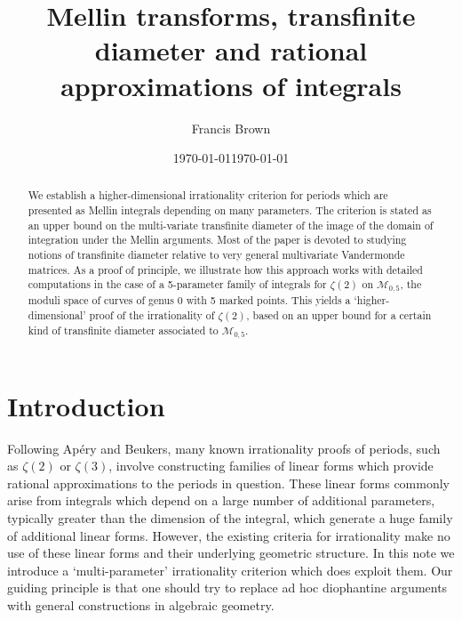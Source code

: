 \documentclass[a4paper,10pt]{amsart}
\date{\today}
\theoremstyle{definition}
\theoremstyle{remark}
\numberwithin{equation}{section}
\newcommand{\0}{\color{blue}{\mathsf{0}}}
\begin{document}
\title{Mellin transforms, transfinite diameter and rational approximations of integrals}
\author{Francis Brown}
\address{University of Oxford, Radcliffe Observatory, Andrew Wiles Building, Woodstock Rd, Oxford, United Kingdom, OX2 6GG}
\date{\today}

\maketitle

\begin{abstract}
We establish a higher-dimensional irrationality criterion for periods which are presented  as Mellin integrals depending on many parameters. 
The criterion is stated as an upper bound on the  multi-variate  transfinite diameter of the image of the domain of integration under the Mellin arguments. 
Most of the paper is devoted to studying notions of transfinite diameter relative to very general multivariate Vandermonde matrices. 
 As a proof of principle, we illustrate how this approach works with detailed computations in the case of  a 5-parameter family of integrals for $\zeta(2)$
 on $\mathcal{M}_{0,5}$, the moduli space of curves of genus 0 with 5 marked points.
This yields a `higher-dimensional' proof of the irrationality of $\zeta(2)$, based on an upper bound for a certain  kind of transfinite diameter associated to $\mathcal{M}_{0,5}$.    \end{abstract}

\section{Introduction}
Following Ap\'ery and Beukers,  many known irrationality proofs of periods, such as  $\zeta(2)$ or $\zeta(3)$,  involve
constructing families of linear forms which provide rational approximations to the periods in question. 
These linear forms commonly arise from  integrals which depend on a  large number of  additional parameters, typically  greater than the dimension of the integral, which generate a huge family of additional  linear forms. However, the existing criteria for irrationality make no use of these  linear forms and their underlying  geometric structure.
 In this note we introduce a `multi-parameter' irrationality criterion which does exploit them. 
Our guiding principle  is that one should try to   replace ad hoc diophantine  arguments    with  general constructions in algebraic geometry. 
\end{document}
